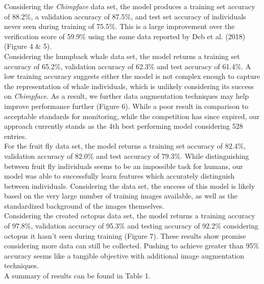 \documentclass[11pt]{article}
\begin{document}
\noindent
Considering the \textit{Chimpface} data set, the model produces a training set accuracy of 88.2\%, a validation accuracy of 87.5\%, and test set accuracy of individuals never seen during training of 75.5\%. This is a large improvement over the verification score of 59.9\% using the same data reported by Deb et al. (2018) \cite{deb2018face} (Figure 4 \& 5).
\newline
\\
Considering the humpback whale data set, the model returns a training set accuracy of 65.2\%, validation accuracy of 62.3\% and test accuracy of 61.4\%. A low training accuracy suggests either the model is not complex enough to capture the representation of whale individuals, which is unlikely considering its success on \textit{Chimpface}. As a result, we further data augmentation techniques may help improve performance further (Figure 6). While a poor result in comparison to acceptable standards for monitoring, while the competition has since expired, our approach currently stands as the 4th best performing model considering 528 entries. 
\newline
\\
For the fruit fly data set, the model returns a training set accuracy of 82.4\%, validation accuracy of 82.0\% and test accuracy of 79.3\%. While distinguishing between fruit fly individuals seems to be an impossible task for humans, our model was able to successfully learn features which accurately distinguish between individuals. Considering the data set, the success of this model is likely based on the very large number of training images available, as well as the standardized background of the images themselves.
\newline
\\
Considering the created octopus data set, the model returns a training accuracy of 97.8\%, validation accuracy of 95.3\% and testing accuracy of 92.2\% considering octopus it hasn't seen during training (Figure 7). These results show promise considering more data can still be collected. Pushing to achieve greater than 95\% accuracy seems like a tangible objective with additional image augmentation techniques. 
\newline
\\
A summary of results can be found in Table 1.
\end{document}
